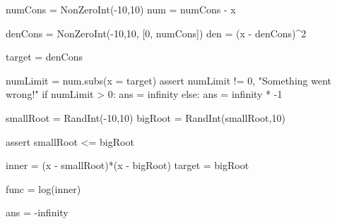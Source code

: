 \begin{sagesilent}
numCons = NonZeroInt(-10,10)
num = numCons - x

denCons = NonZeroInt(-10,10, [0, numCons])
den = (x - denCons)^2

target = denCons

numLimit = num.subs(x = target)
assert numLimit != 0, "Something went wrong!"
if numLimit > 0:
    ans = infinity
else:
    ans = infinity * -1

\end{sagesilent}


\begin{sagesilent}

smallRoot = RandInt(-10,10)
bigRoot   = RandInt(smallRoot,10)

assert smallRoot <= bigRoot

inner = (x - smallRoot)*(x - bigRoot)
target = bigRoot

func = log(inner)

ans = -infinity

\end{sagesilent}


